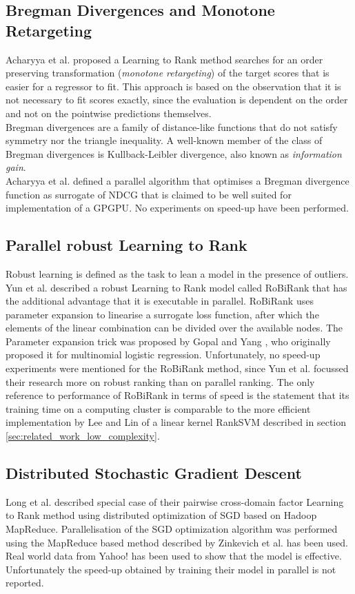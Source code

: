 \subsection{Bregman Divergences and Monotone Retargeting}
Acharyya et al. \cite{Acharyya2012, Acharyya2013} proposed a Learning to Rank method searches for an order preserving transformation (\emph{monotone retargeting}) of the target scores that is easier for a regressor to fit. This approach is based on the observation that it is not necessary to fit scores exactly, since the evaluation is dependent on the order and not on the pointwise predictions themselves.\\

Bregman divergences are a family of distance-like functions that do not satisfy symmetry nor the triangle inequality. A well-known member of the class of Bregman divergences is Kullback-Leibler divergence, also known as \emph{information gain}.\\

Acharyya et al. \cite{Acharyya2012, Acharyya2013} defined a parallel algorithm that optimises a Bregman divergence function as surrogate of \ac{NDCG} that is claimed to be well suited for implementation of a \ac{GPGPU}. No experiments on speed-up have been performed.
\subsection{Parallel robust Learning to Rank}
Robust learning \cite{Huber1981} is defined as the task to lean a model in the presence of outliers. Yun et al. described a \cite{Yun2014} robust Learning to Rank model called RoBiRank that has the additional advantage that it is executable in parallel. RoBiRank uses parameter expansion to linearise a surrogate loss function, after which the elements of the linear combination can be divided over the available nodes. The Parameter expansion trick was proposed by Gopal and Yang \cite{Gopal2013}, who originally proposed it for multinomial logistic regression. Unfortunately, no speed-up experiments were mentioned for the RoBiRank method, since Yun et al. focussed their research more on robust ranking than on parallel ranking. The only reference to performance of RoBiRank in terms of speed is the statement that its training time on a computing cluster is comparable to the more efficient implementation by Lee and Lin \cite{Lee2014} of a linear kernel Rank\ac{SVM} \cite{Herbrich1999, Joachims2002} described in section \ref{sec:related_work_low_complexity}.
\subsection{Distributed Stochastic Gradient Descent}
Long et al. \cite{Long2012} described special case of their pairwise cross-domain factor Learning to Rank method using distributed optimization of \ac{SGD} based on Hadoop MapReduce. Parallelisation of the \ac{SGD} optimization algorithm was performed using the MapReduce based method described by  Zinkevich et al. \cite{Zinkevich2010} has been used. Real world data from Yahoo! has been used to show that the model is effective. Unfortunately the speed-up obtained by training their model in parallel is not reported.\\

